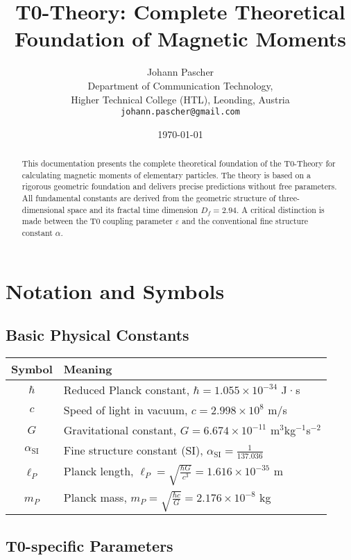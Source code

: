 \documentclass[12pt,a4paper]{article}
\title{T0-Theory: Complete Theoretical Foundation of Magnetic Moments}
\author{Johann Pascher\\
	Department of Communication Technology,\\
	Higher Technical College (HTL), Leonding, Austria\\
	\texttt{johann.pascher@gmail.com}}
\date{\today}
\numberwithin{equation}{section}
\newcommand{\epsilonT}{\varepsilon}
\newcommand{\alphaSI}{\alpha_{\text{SI}}}
\newcommand{\Df}{D_f}
\newcommand{\lP}{\ell_P}
\begin{document}
	
	\maketitle
	
	\begin{abstract}
		This documentation presents the complete theoretical foundation of the T0-Theory for calculating magnetic moments of elementary particles. The theory is based on a rigorous geometric foundation and delivers precise predictions without free parameters. All fundamental constants are derived from the geometric structure of three-dimensional space and its fractal time dimension $\Df = 2.94$. A critical distinction is made between the T0 coupling parameter $\epsilonT$ and the conventional fine structure constant $\alpha$.
	\end{abstract}
	
	\tableofcontents
	\newpage
	
	\section{Notation and Symbols}
	
	\subsection{Basic Physical Constants}
	
	\begin{longtable}{cl}
		\toprule
		\textbf{Symbol} & \textbf{Meaning} \\
		\midrule
		$\hbar$ & Reduced Planck constant, $\hbar = 1.055 \times 10^{-34}$ J·s \\
		$c$ & Speed of light in vacuum, $c = 2.998 \times 10^{8}$ m/s \\
		$G$ & Gravitational constant, $G = 6.674 \times 10^{-11}$ m$^3$kg$^{-1}$s$^{-2}$ \\
		$\alphaSI$ & Fine structure constant (SI), $\alphaSI = \frac{1}{137.036}$ \\
		$\lP$ & Planck length, $\lP = \sqrt{\frac{\hbar G}{c^3}} = 1.616 \times 10^{-35}$ m \\
		$m_P$ & Planck mass, $m_P = \sqrt{\frac{\hbar c}{G}} = 2.176 \times 10^{-8}$ kg \\
		\bottomrule
	\end{longtable}
	
	\subsection{T0-specific Parameters}
	
\end{document}
